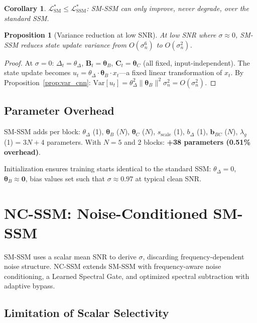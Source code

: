 \documentclass[journal]{IEEEtran}
\newtheorem{proposition}{Proposition}
\newtheorem{corollary}{Corollary}
\begin{document}
\begin{corollary}
$\mathcal{L}^*_{\text{SM}} \leq \mathcal{L}^*_{\text{SSM}}$: SM-SSM can only improve, never degrade, over the standard SSM.
\end{corollary}

\begin{proposition}[Variance reduction at low SNR]
\label{prop:var_reduction}
At low SNR where $\sigma \approx 0$, SM-SSM reduces state update variance from $O(\sigma_n^6)$ to $O(\sigma_n^2)$.
\end{proposition}
\begin{proof}
At $\sigma = 0$: $\Delta_t = \theta_\Delta$, $\mathbf{B}_t = \bm{\theta}_B$, $\mathbf{C}_t = \bm{\theta}_C$ (all fixed, input-independent).
The state update becomes $u_t = \theta_\Delta \cdot \bm{\theta}_B \cdot x_t$---a fixed linear transformation of $x_t$.
By Proposition~\ref{prop:var_cnn}: $\mathrm{Var}[u_t] = \theta_\Delta^2 \|\bm{\theta}_B\|^2 \sigma_n^2 = O(\sigma_n^2)$.
\end{proof}

\subsection{Parameter Overhead}

SM-SSM adds per block: $\theta_\Delta$ (1), $\bm{\theta}_B$ ($N$), $\bm{\theta}_C$ ($N$), $s_{\text{scale}}$ (1), $b_\Delta$ (1), $\mathbf{b}_{BC}$ ($N$), $\lambda_g$ (1) = $3N{+}4$ parameters.
With $N{=}5$ and 2 blocks: \textbf{+38 parameters (0.51\% overhead)}.

Initialization ensures training starts identical to the standard SSM: $\theta_\Delta = 0$, $\bm{\theta}_B \approx \mathbf{0}$, bias values set such that $\sigma \approx 0.97$ at typical clean SNR.


\section{NC-SSM: Noise-Conditioned SM-SSM}
\label{sec:ncssm}

SM-SSM uses a scalar mean SNR to derive $\sigma$, discarding frequency-dependent noise structure.
NC-SSM extends SM-SSM with frequency-aware noise conditioning, a Learned Spectral Gate, and optimized spectral subtraction with adaptive bypass.

\subsection{Limitation of Scalar Selectivity}
\end{document}
